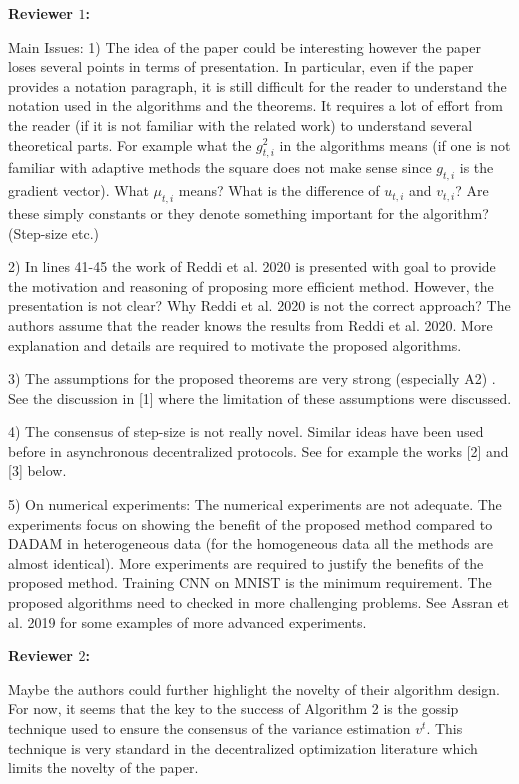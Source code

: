 \documentclass{article}
\begin{document}
\textbf{Reviewer $1$:}

Main Issues:
1) The idea of the paper could be interesting however the paper loses several points in terms of presentation.
In particular, even if the paper provides a notation paragraph, it is still difficult for the reader to understand the notation used in the algorithms and the theorems. It requires a lot of effort from the reader (if it is not familiar with the related work) to understand several theoretical parts.
For example what the $g_{t,i}^2$ in the algorithms means (if one is not familiar with adaptive methods the square does not make sense since $g_{t,i}$ is the gradient vector). What $\mu_{t,i}$ means? What is the difference of $u_{t,i}$ and $v_{t,i}$? Are these simply constants or they denote something important for the algorithm? (Step-size etc.)

2) In lines 41-45 the work of Reddi et al. 2020 is presented with goal to provide the motivation and reasoning of proposing more efficient method. However, the presentation is not clear? Why Reddi et al. 2020 is not the correct approach? The authors assume that the reader knows the results from Reddi et al. 2020. More explanation and details are required to motivate the proposed algorithms.

3) The assumptions for the proposed theorems are very strong (especially A2) . See the discussion in [1] where the limitation of these assumptions were discussed.

4) The consensus of step-size is not really novel. Similar ideas have been used before in asynchronous decentralized protocols. See for example the works [2] and [3] below.

5) On numerical experiments:
The numerical experiments are not adequate. The experiments focus on showing the benefit of the proposed method compared to DADAM in heterogeneous data (for the homogeneous data all the methods are almost identical). More experiments are required to justify the benefits of the proposed method.
Training CNN on MNIST is the minimum requirement. The proposed algorithms need to checked in more challenging problems. See Assran et al. 2019 for some examples of more advanced experiments.


\textbf{Reviewer $2$:}

Maybe the authors could further highlight the novelty of their algorithm design.
For now, it seems that the key to the success of Algorithm 2 is the gossip technique used to ensure the consensus of the variance estimation $v^t$. This technique is very standard in the decentralized optimization literature which limits the novelty of the paper.
\end{document}

